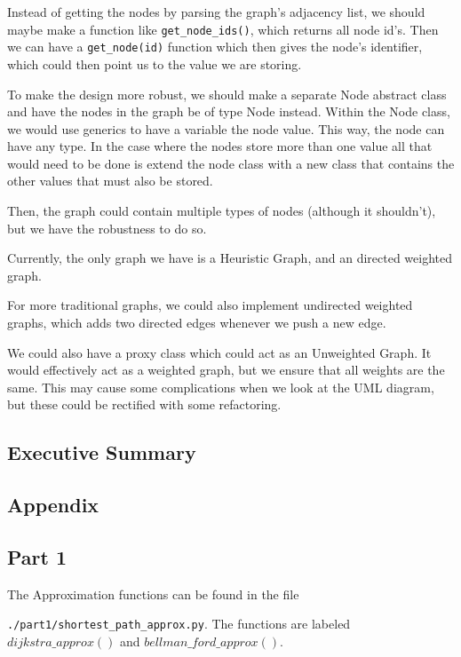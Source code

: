 \documentclass{article}
\begin{document}
Instead of getting the nodes by parsing the graph's adjacency list, we should maybe make a function like \verb|get_node_ids()|, which returns all node id's. Then we can have a \verb|get_node(id)| function which then gives the node's identifier, which could then point us to the value we are storing.

To make the design more robust, we should make a separate Node abstract class
and have the nodes in the graph be of type Node instead. Within the Node class, we would use generics to have a variable the node value. This way, the node can have any type. In the case where the nodes store more than one value all that would need to be done is extend the node class with a new class that contains the other values that must also be stored. 

Then, the graph could contain multiple types of nodes (although it shouldn't), but we have the robustness to do so.

Currently, the only graph we have is a Heuristic Graph, and an directed weighted graph.

For more traditional graphs, we could also implement undirected weighted graphs, which adds two directed edges whenever we push a new edge.

We could also have a proxy class which could act as an Unweighted Graph. It would effectively act as a weighted graph, but we ensure that all weights are the same. This may cause some complications when we look at the UML diagram, but these could be rectified with some refactoring.

\newpage
\subsection{Executive Summary}


\newpage
\subsection{Appendix}

\subsection{Part 1}

The Approximation functions can be found in the file

\verb|./part1/shortest_path_approx.py|.
The functions are labeled $dijkstra\_approx()$ and $bellman\_ford\_approx()$.
\end{document}
